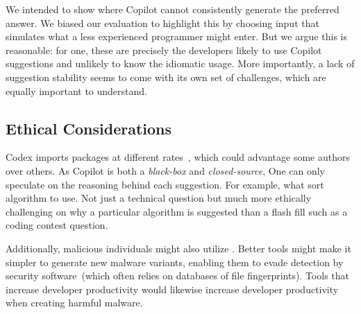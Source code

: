 We intended to show where Copilot cannot consistently generate the preferred answer. We biased our evaluation to highlight this by choosing input that simulates what a less experienced programmer might enter. 
But we argue this is reasonable: for one, these are precisely the developers likely to use Copilot suggestions and unlikely to know the idiomatic usage.
More importantly, a lack of suggestion stability seems to come with its own set of challenges, which are equally important to understand.%
%

\subsection{Ethical Considerations}
\label{ethics}
Codex imports packages at different rates~\cite{copilot}, which could advantage some authors over others. As Copilot is both a \emph{black-box} and \emph{closed-source}, One can only speculate on the reasoning behind each suggestion. For example, what sort algorithm to use. Not just a technical question but much more ethically challenging on why a particular algorithm is suggested than a flash fill such as a coding contest question.

Additionally, malicious individuals might also utilize \cct{}. Better tools might make it simpler to generate new malware variants, enabling them to evade detection by security software~(which often relies on databases of file fingerprints). 
Tools that increase developer productivity would likewise increase developer productivity when creating harmful malware.